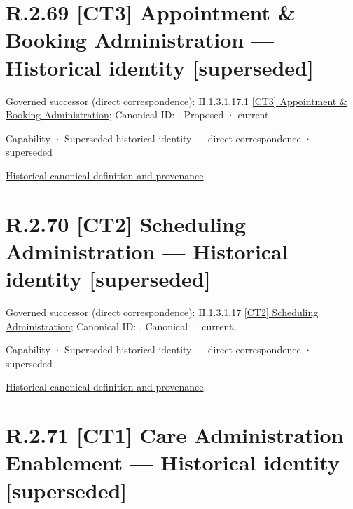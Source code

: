\section*{R.2.69 [CT3] Appointment \& Booking Administration — Historical identity [superseded]}
\label{navigation:R.2.69}

{\small Governed successor (direct correspondence): II.1.3.1.17.1 \hyperref[element:7b3ba9bcac564dd4a7a08631581db2ca]{[CT3] Appointment \& Booking Administration}; Canonical ID: \texttt{}. Proposed · current.}\par
\label{element:cdc16dd0f84049f8af3f1ec76f1e1428}
{\small Capability · Superseded historical identity — direct correspondence · superseded}\par
\href{../../../../continuum/strategy/capability/cdc16dd0f84049f8af3f1ec76f1e1428.md}{Historical canonical definition and provenance}.\par
\section*{R.2.70 [CT2] Scheduling Administration — Historical identity [superseded]}
\label{navigation:R.2.70}

{\small Governed successor (direct correspondence): II.1.3.1.17 \hyperref[element:35fb3744c900470f9895056246a13fb1]{[CT2] Scheduling Administration}; Canonical ID: \texttt{}. Canonical · current.}\par
\label{element:1a6630940ffb44fcad4543b93a367b67}
{\small Capability · Superseded historical identity — direct correspondence · superseded}\par
\href{../../../../continuum/strategy/capability/1a6630940ffb44fcad4543b93a367b67.md}{Historical canonical definition and provenance}.\par
\section*{R.2.71 [CT1] Care Administration Enablement — Historical identity [superseded]}
\label{navigation:R.2.71}

